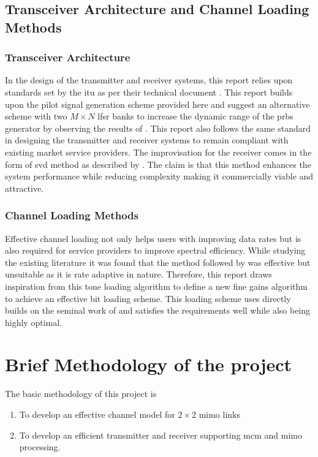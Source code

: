 \subsection{Transceiver Architecture and Channel Loading Methods}
\subsubsection{Transceiver Architecture}
In the design of the transmitter and receiver systems, this report relies upon standards set by the \acrshort{itu} as per their technical document \textcite{ITU2009}. This report builds upon the \gls{pilot signal} generation scheme provided here and suggest an alternative scheme with two $M \times N$ \acrshort{lfsr} banks to increase the dynamic range of the \acrshort{prbs} generator by observing the results of \textcite{Peinado2013}. This report also follows the same \textcite{ITU2009} standard in designing the transmitter and receiver systems to remain compliant with existing market service providers. The improvisation for the receiver comes in the form of \acrlong{svd} method as described by \textcite{Klema1980}. The claim is that this method enhances the system performance while reducing complexity making it commercially viable and attractive. 

\subsubsection{Channel Loading Methods}
Effective channel loading not only helps users with improving data rates but is also required for service providers to improve spectral efficiency. While studying the existing literature it was found that the method followed by \textcite{Chow1995} was effective but unsuitable as it is rate adaptive in nature. Therefore, this report draws inspiration from this tone loading algorithm to define a new fine gains algorithm to achieve an effective bit loading scheme. This loading scheme uses directly builds on the seminal work of \textcite{Shannon1948} and satisfies the requirements well while also being highly optimal.


\section{Brief Methodology of the project}
The basic methodology of this project is 
\begin{enumerate}
\item To develop an effective channel model for $2 \times 2$ \acrshort{mimo} links
\item To develop an efficient transmitter and receiver supporting \acrshort{mcm} and \acrshort{mimo} processing.
\end{enumerate}

